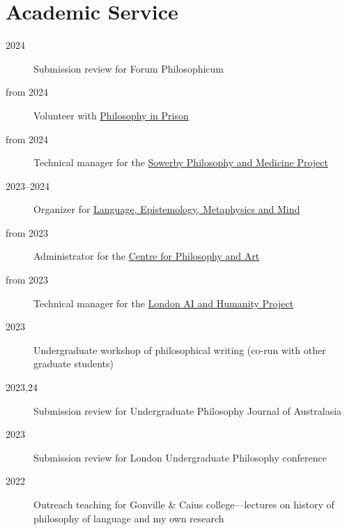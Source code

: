 \documentclass{cv}
\begin{document}
\section*{Academic Service}
\begin{description}
\item[{2024}] Submission review for Forum Philosophicum
\item[{from 2024}] Volunteer with \href{https://www.philosophyinprison.com/}{Philosophy in Prison}
\item[{from 2024}] Technical manager for the \href{https://www.philosophyandmedicine.org/}{Sowerby Philosophy and
Medicine Project}
\item[{2023--2024}] Organizer for \href{https://www.lemm-london.co.uk/}{Language, Epistemology, Metaphysics and Mind}
\item[{from 2023}] Administrator for the \href{https://philosophyarts.co.uk/}{Centre for Philosophy and Art}
\item[{from 2023}] Technical manager for the \href{https://www.ai-humanity-london.com/}{London AI and Humanity Project}
\item[{2023}] Undergraduate workshop of philosophical writing (co-run with other graduate students)
\item[{2023,24}] Submission review for Undergraduate Philosophy
  Journal of Australasia
\item[{2023}] Submission review for London Undergraduate Philosophy
conference
\item[{2022}] Outreach teaching for Gonville \& Caius college---lectures on
history of philosophy of language and my own research
\end{description}
\end{document}
